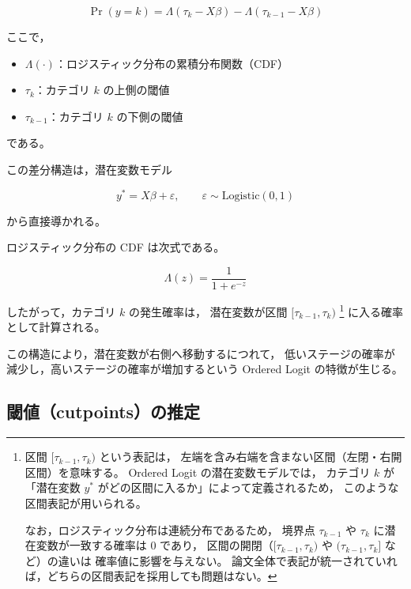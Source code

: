 \begin{equation}
\Pr(y = k)
=
\Lambda(\tau_k - X\beta)
-
\Lambda(\tau_{k-1} - X\beta)
\label{eq:ordered_prob}
\end{equation}

ここで，

\begin{itemize}
    \item $\Lambda(\cdot)$：ロジスティック分布の累積分布関数（CDF）
    \item $\tau_k$：カテゴリ $k$ の上側の閾値
    \item $\tau_{k-1}$：カテゴリ $k$ の下側の閾値
\end{itemize}

である。

この差分構造は，潜在変数モデル



\[
y^* = X\beta + \varepsilon, \qquad \varepsilon \sim \text{Logistic}(0,1)
\]



から直接導かれる。

ロジスティック分布の CDF は次式である。



\[
\Lambda(z) = \frac{1}{1 + e^{-z}}
\]



したがって，カテゴリ $k$ の発生確率は，
潜在変数が区間 $[\tau_{k-1}, \tau_k)$ \footnote{
区間 $[\tau_{k-1}, \tau_k)$ という表記は，
左端を含み右端を含まない区間（左閉・右開区間）を意味する。
Ordered Logit の潜在変数モデルでは，
カテゴリ $k$ が「潜在変数 $y^*$ がどの区間に入るか」によって定義されるため，
このような区間表記が用いられる。

なお，ロジスティック分布は連続分布であるため，
境界点 $\tau_{k-1}$ や $\tau_k$ に潜在変数が一致する確率は 0 であり，
区間の開閉（$[\tau_{k-1}, \tau_k)$ や $(\tau_{k-1}, \tau_k]$ など）の違いは
確率値に影響を与えない。
論文全体で表記が統一されていれば，どちらの区間表記を採用しても問題はない。
}
に入る確率として計算される。

この構造により，潜在変数が右側へ移動するにつれて，
低いステージの確率が減少し，高いステージの確率が増加するという Ordered Logit の特徴が生じる。


\subsection{閾値（cutpoints）の推定}

